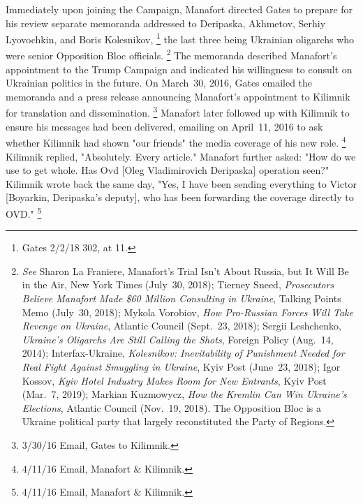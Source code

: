 Immediately upon joining the Campaign, Manafort directed Gates to prepare for his review separate memoranda addressed to Deripaska, Akhmetov, Serhiy Lyovochkin, and Boris Kolesnikov,%
\footnote{Gates 2/2/18 302, at 11.}
the last three being Ukrainian oligarchs who were senior Opposition Bloc officials.%
\footnote{\textit{See} Sharon La Franiere, Manafort's Trial Isn't About Russia, but It Will Be in the Air, New York Times (July~30, 2018);
Tierney Sneed, \textit{Prosecutors Believe Manafort Made \$60 Million Consulting in Ukraine}, Talking Points Memo (July~30, 2018);
Mykola Vorobiov, \textit{How Pro-Russian Forces Will Take Revenge on Ukraine}, Atlantic Council (Sept.~23, 2018);
Sergii Leshchenko, \textit{Ukraine's Oligarchs Are Still Calling the Shots}, Foreign Policy (Aug.~14, 2014);
Interfax-Ukraine, \textit{Kolesnikov: Inevitability of Punishment Needed for Real Fight Against Smuggling in Ukraine}, Kyiv Post (June~23, 2018);
Igor Kossov, \textit{Kyiv Hotel Industry Makes Room for New Entrants}, Kyiv Post (Mar.~7, 2019);
Markian Kuzmowycz, \textit{How the Kremlin Can Win Ukraine's Elections}, Atlantic Council (Nov.~19, 2018).
The Opposition Bloc is a Ukraine political party that largely reconstituted the Party of Regions.
}
The memoranda described Manafort's appointment to the Trump Campaign and indicated his willingness to consult on Ukrainian politics in the future.
On March~30, 2016, Gates emailed the memoranda and a press release announcing Manafort's appointment to Kilimnik for translation and dissemination.%
\footnote{3/30/16 Email, Gates to Kilimnik.}
Manafort later followed up with Kilimnik to ensure his messages had been delivered, emailing on April~11, 2016 to ask whether Kilimnik had shown "our friends" the media coverage of his new role.%
\footnote{4/11/16 Email, Manafort \& Kilimnik.}
Kilimnik replied, "Absolutely.
Every article."
Manafort further asked: "How do we use to get whole.
Has Ovd [Oleg Vladimirovich Deripaska] operation seen?"
Kilimnik wrote back the same day, "Yes, I have been sending everything to Victor [Boyarkin, Deripaska's deputy], who has been forwarding the coverage directly to OVD."%
\footnote{4/11/16 Email, Manafort \& Kilimnik.}

